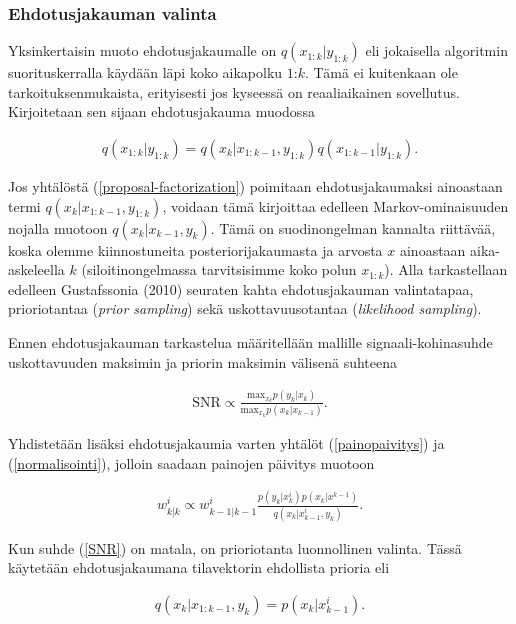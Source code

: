 \documentclass[
  12pt,
  a4paper, twoside]{book}
\begin{document}
\subsubsection{Ehdotusjakauman valinta}

Yksinkertaisin muoto ehdotusjakaumalle on \(q(x_{1:k}|y_{1:k})\) eli jokaisella algoritmin suorituskerralla käydään läpi koko aikapolku \(1\):\(k\). Tämä ei kuitenkaan ole tarkoituksenmukaista, erityisesti jos kyseessä on reaaliaikainen sovellutus. Kirjoitetaan sen sijaan ehdotusjakauma muodossa

\begin{align}\label{proposal-factorization}
q(x_{1:k}|y_{1:k})=q(x_k|x_{1:k-1},y_{1:k})q(x_{1:k-1}|y_{1:k}).
\end{align}

Jos yhtälöstä (\ref{proposal-factorization}) poimitaan ehdotusjakaumaksi ainoastaan termi \(q(x_k|x_{1:k-1},y_{1:k})\), voidaan tämä kirjoittaa edelleen Markov-ominaisuuden nojalla muotoon \(q(x_k|x_{k-1},y_{k})\). Tämä on suodinongelman kannalta riittävää, koska olemme kiinnostuneita posteriorijakaumasta ja arvosta \(x\) ainoastaan aika-askeleella \(k\) (siloitinongelmassa tarvitsisimme koko polun \(x_{1:k}\)). Alla tarkastellaan edelleen Gustafssonia (2010) \citep{gustafsson-2010} seuraten kahta ehdotusjakauman valintatapaa, prioriotantaa (\emph{prior sampling}) sekä uskottavuusotantaa (\emph{likelihood sampling}).

Ennen ehdotusjakauman tarkastelua määritellään mallille signaali-kohinasuhde uskottavuuden maksimin ja priorin maksimin välisenä suhteena

\begin{align}\label{SNR}
\text{SNR}\propto \frac{\text{max}_{x_k}p(y_k|x_k)}{\text{max}_{x_k}p(x_k|x_{k-1})}. 
\end{align}

\noindent Yhdistetään lisäksi ehdotusjakaumia varten yhtälöt (\ref{painopaivitys}) ja (\ref{normalisointi}), jolloin saadaan painojen päivitys muotoon

\begin{align}\label{painopaivitys-propto}
w^i_{k|k} \propto w^i_{k-1|k-1}\frac{p(y_k|x^i_k)p(x_k|x^{k-1})}{q(x_k|x^i_{k-1},y_k)}.
\end{align}

Kun suhde (\ref{SNR}) on matala, on prioriotanta luonnollinen valinta. Tässä käytetään ehdotusjakaumana tilavektorin ehdollista prioria eli

\begin{align}\label{prioriotanta-q}
q(x_k|x_{1:k-1},y_{k})=p(x_k|x^i_{k-1}).
\end{align}
\end{document}

